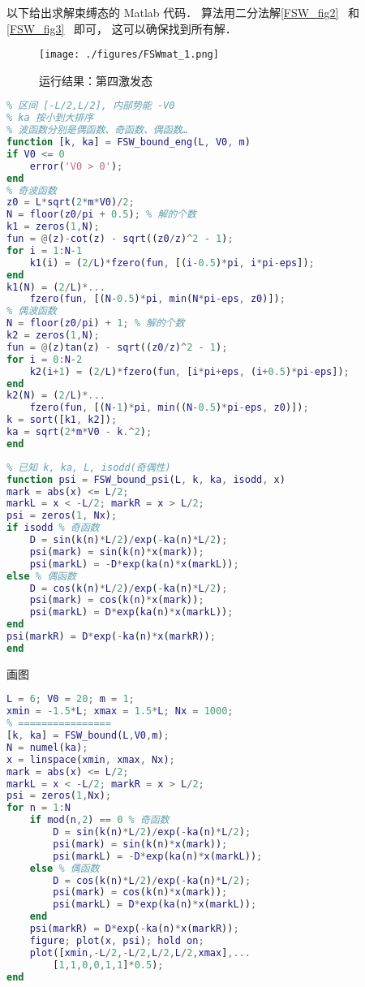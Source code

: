 

以下给出求解束缚态的 Matlab 代码． 算法用二分法解\autoref{FSW_fig2}~ 和\autoref{FSW_fig3}~ 即可， 这可以确保找到所有解．

\begin{figure}[ht]
\centering
\texttt{[image: ./figures/FSWmat\_1.png]}
\caption{运行结果：第四激发态} \label{FSWmat_fig1}
\end{figure}

\begin{lstlisting}[language=matlab, caption=FSW\_bound\_eng.m]
% 计算有限深势阱的束缚态能级（E = k.^2/2 - V0）
% 区间 [-L/2,L/2], 内部势能 -V0
% ka 按小到大排序
% 波函数分别是偶函数、奇函数、偶函数…
function [k, ka] = FSW_bound_eng(L, V0, m)
if V0 <= 0
    error('V0 > 0');
end
% 奇波函数
z0 = L*sqrt(2*m*V0)/2;
N = floor(z0/pi + 0.5); % 解的个数
k1 = zeros(1,N);
fun = @(z)-cot(z) - sqrt((z0/z)^2 - 1);
for i = 1:N-1
    k1(i) = (2/L)*fzero(fun, [(i-0.5)*pi, i*pi-eps]);
end
k1(N) = (2/L)*...
    fzero(fun, [(N-0.5)*pi, min(N*pi-eps, z0)]);
% 偶波函数
N = floor(z0/pi) + 1; % 解的个数
k2 = zeros(1,N);
fun = @(z)tan(z) - sqrt((z0/z)^2 - 1);
for i = 0:N-2
    k2(i+1) = (2/L)*fzero(fun, [i*pi+eps, (i+0.5)*pi-eps]);
end
k2(N) = (2/L)*...
    fzero(fun, [(N-1)*pi, min((N-0.5)*pi-eps, z0)]);
k = sort([k1, k2]);
ka = sqrt(2*m*V0 - k.^2);
end
\end{lstlisting}

\begin{lstlisting}[language=matlab, caption=FSW\_bound\_psi.m]
% 求方势阱波函数的值 psi(x)
% 已知 k, ka, L, isodd(奇偶性)
function psi = FSW_bound_psi(L, k, ka, isodd, x)
mark = abs(x) <= L/2;
markL = x < -L/2; markR = x > L/2;
psi = zeros(1, Nx);
if isodd % 奇函数
    D = sin(k(n)*L/2)/exp(-ka(n)*L/2);
    psi(mark) = sin(k(n)*x(mark));
    psi(markL) = -D*exp(ka(n)*x(markL));
else % 偶函数
    D = cos(k(n)*L/2)/exp(-ka(n)*L/2);
    psi(mark) = cos(k(n)*x(mark));
    psi(markL) = D*exp(ka(n)*x(markL));
end
psi(markR) = D*exp(-ka(n)*x(markR));
end
\end{lstlisting}

画图
\begin{lstlisting}[language=matlab, caption=FSW\_bound\_demo.m]
% === 参数设置 ===
L = 6; V0 = 20; m = 1;
xmin = -1.5*L; xmax = 1.5*L; Nx = 1000;
% ================
[k, ka] = FSW_bound(L,V0,m);
N = numel(ka);
x = linspace(xmin, xmax, Nx);
mark = abs(x) <= L/2;
markL = x < -L/2; markR = x > L/2;
psi = zeros(1,Nx);
for n = 1:N
    if mod(n,2) == 0 % 奇函数
        D = sin(k(n)*L/2)/exp(-ka(n)*L/2);
        psi(mark) = sin(k(n)*x(mark));
        psi(markL) = -D*exp(ka(n)*x(markL));
    else % 偶函数
        D = cos(k(n)*L/2)/exp(-ka(n)*L/2);
        psi(mark) = cos(k(n)*x(mark));
        psi(markL) = D*exp(ka(n)*x(markL));
    end
    psi(markR) = D*exp(-ka(n)*x(markR));
    figure; plot(x, psi); hold on;
    plot([xmin,-L/2,-L/2,L/2,L/2,xmax],...
        [1,1,0,0,1,1]*0.5);
end
\end{lstlisting}
